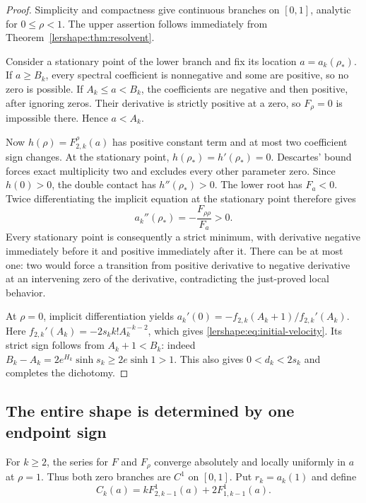 \documentclass[11pt,a4paper]{article}
\numberwithin{equation}{section}
\theoremstyle{definition}
\theoremstyle{remark}
\begin{document}
\begin{proof}
Simplicity and compactness give continuous branches on $[0,1]$, analytic
for $0\leq\rho<1$. The upper assertion follows immediately from
Theorem~\ref{lershape:thm:resolvent}.

Consider a stationary point of the lower branch and fix its location
$a=a_k(\rho_*)$. If $a\geq B_k$, every spectral coefficient is
nonnegative and some are positive, so no zero is possible. If
$A_k\leq a<B_k$, the coefficients are negative and then positive,
after ignoring zeros. Their derivative is strictly positive at a zero,
so $F_\rho=0$ is impossible there. Hence $a<A_k$.

Now $h(\rho)=F_{2,k}^{\rho}(a)$ has positive constant term and at
most two coefficient sign changes. At the stationary point,
$h(\rho_*)=h'(\rho_*)=0$. Descartes' bound forces exact multiplicity
two and excludes every other parameter zero. Since $h(0)>0$, the
double contact has $h''(\rho_*)>0$. The lower root has $F_a<0$.
Twice differentiating the implicit equation at the stationary point
therefore gives
\[
 a_k''(\rho_*)=-\frac{F_{\rho\rho}}{F_a}>0.
\]
Every stationary point is consequently a strict minimum, with derivative
negative immediately before it and positive immediately after it.
There can be at most one: two would force a transition from positive
derivative to negative derivative at an intervening zero of the
derivative, contradicting the just-proved local behavior.

At $\rho=0$, implicit differentiation yields
$a_k'(0)=-f_{2,k}(A_k+1)/f_{2,k}'(A_k)$. Here
$f_{2,k}'(A_k)=-2s_k k!A_k^{-k-2}$, which gives
\eqref{lershape:eq:initial-velocity}. Its strict sign follows from
$A_k+1<B_k$: indeed
$B_k-A_k=2e^{H_k}\sinh s_k\geq2e\sinh1>1$.
This also gives $0<d_k<2s_k$ and completes the dichotomy.
\end{proof}

\subsection{The entire shape is determined by one endpoint sign}

For $k\geq2$, the series for $F$ and $F_\rho$ converge absolutely and
locally uniformly in $a$ at $\rho=1$. Thus both zero branches are $C^1$
on $[0,1]$. Put $r_k=a_k(1)$ and define
\begin{equation}\label{lershape:eq:Ck}
 C_k(a)=kF_{2,k-1}^{1}(a)+2F_{1,k-1}^{1}(a).
\end{equation}
\end{document}
